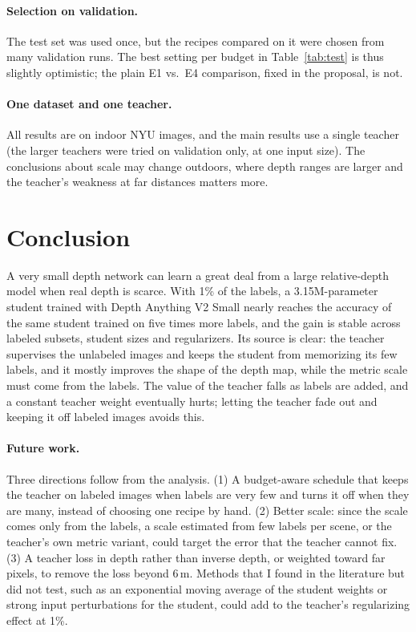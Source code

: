 \documentclass[11pt]{article}
\begin{document}
\paragraph{Selection on validation.} The test set was used once, but the recipes compared on it were
chosen from many validation runs. The best setting per budget in Table~\ref{tab:test} is thus
slightly optimistic; the plain E1 vs.\ E4 comparison, fixed in the proposal, is not.

\paragraph{One dataset and one teacher.} All results are on indoor NYU images, and the main results
use a single teacher (the larger teachers were tried on validation only, at one input size).
The conclusions about scale may change outdoors, where depth ranges are larger and the teacher's
weakness at far distances matters more.

\section{Conclusion}

A very small depth network can learn a great deal from a large relative-depth model when real depth
is scarce. With 1\% of the labels, a 3.15M-parameter student trained with Depth Anything V2 Small
nearly reaches the accuracy of the same student trained on five times more labels, and the gain is stable
across labeled subsets, student sizes and regularizers. Its source is clear: the teacher supervises
the unlabeled images and keeps the student from memorizing its few labels, and it mostly improves
the shape of the depth map, while the metric scale must come from the labels. The value of the
teacher falls as labels are added, and a constant teacher weight eventually hurts; letting the
teacher fade out and keeping it off labeled images avoids this.

\paragraph{Future work.} Three directions follow from the analysis. (1) A budget-aware schedule
that keeps the teacher on labeled images when labels are very few and turns it off when they are
many, instead of choosing one recipe by hand. (2) Better scale: since the scale comes only from the
labels, a scale estimated from few labels per scene, or the teacher's own metric variant, could
target the error that the teacher cannot fix. (3) A teacher loss in depth rather than inverse depth,
or weighted toward far pixels, to remove the loss beyond 6\,m. Methods that I found in the
literature but did not test, such as an exponential moving average of the student weights or strong
input perturbations for the student, could add to the teacher's regularizing effect at 1\%.
\end{document}
